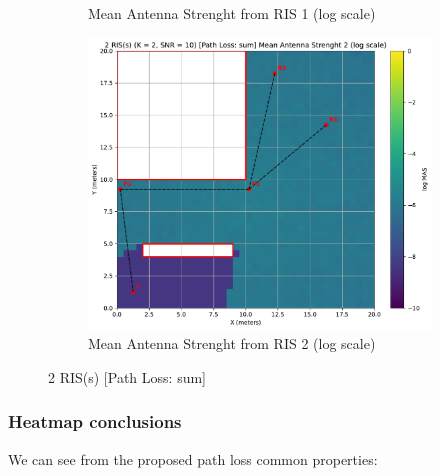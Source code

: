 \begin{figure}[H]
\begin{subfigure}[b]{0.48\textwidth}
    \caption{Mean Antenna Strenght from RIS 1 (log scale)}
  \end{subfigure}
  \hfill
  \begin{subfigure}[b]{0.48\textwidth}
    \centering
    \includegraphics[width=\textwidth]{imgs/heatmap-simulations/2 RIS(s) (K = 2, SNR = 10) [Path Loss: sum] Mean Antenna Strenght 2 (log scale).pdf}
    \caption{Mean Antenna Strenght from RIS 2 (log scale)}
  \end{subfigure}
  \caption{2 RIS(s) [Path Loss: sum]}
\end{figure}

\newpage
\subsubsection{Heatmap conclusions}

We can see from the proposed path loss common properties:

